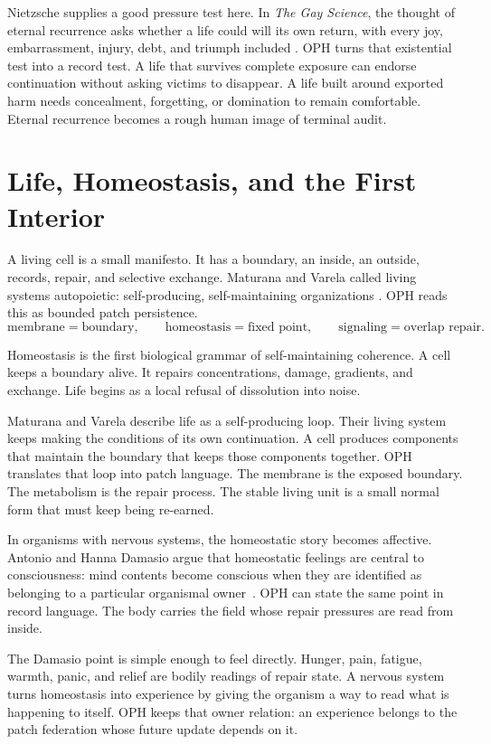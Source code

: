 \documentclass[11pt]{article}
\theoremstyle{remark}
\theoremstyle{plain}
\begin{document}
Nietzsche supplies a good pressure test here. In \emph{The Gay Science}, the
thought of eternal recurrence asks whether a life could will its own return,
with every joy, embarrassment, injury, debt, and triumph included
\cite{Nietzsche1882}. OPH turns that existential test into a record test. A
life that survives complete exposure can endorse continuation without asking
victims to disappear. A life built around exported harm needs concealment,
forgetting, or domination to remain comfortable. Eternal recurrence becomes a
rough human image of terminal audit.

\section{Life, Homeostasis, and the First Interior}

A living cell is a small manifesto. It has a boundary, an inside, an
outside, records, repair, and selective exchange. Maturana and Varela called
living systems autopoietic: self-producing, self-maintaining organizations
\cite{MaturanaVarela1980}. OPH reads this as bounded patch persistence.
\[
\boxed{
\text{membrane}=\text{boundary}, \qquad
\text{homeostasis}=\text{fixed point}, \qquad
\text{signaling}=\text{overlap repair}.
}
\]

Homeostasis is the first biological grammar of self-maintaining coherence. A
cell keeps a boundary alive. It repairs concentrations, damage, gradients, and
exchange. Life begins as a local refusal of dissolution into noise.

Maturana and Varela describe life as a self-producing loop. Their living system
keeps making the conditions of its own continuation.
A cell produces components that maintain the boundary that keeps those
components together. OPH translates that loop into patch language. The membrane
is the exposed boundary. The metabolism is the repair process. The stable living
unit is a small normal form that must keep being re-earned.

In organisms with nervous systems, the homeostatic story becomes affective.
Antonio and Hanna Damasio argue that homeostatic feelings are central to
consciousness: mind contents become conscious when they are identified as
belonging to a particular organismal owner~\cite{Damasio2023}. OPH can state
the same point in record language. The body carries the field whose repair
pressures are read from inside.

The Damasio point is simple enough to feel directly. Hunger, pain, fatigue,
warmth, panic, and relief are bodily readings of repair state. A nervous system
turns homeostasis into experience by giving the organism a way to read what is
happening to itself. OPH
keeps that owner relation: an experience belongs to the patch federation whose
future update depends on it.
\end{document}
